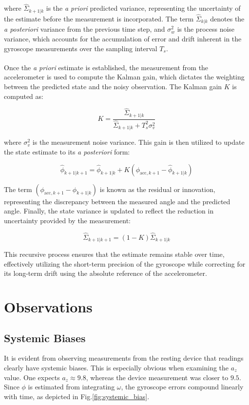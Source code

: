 \documentclass{article}
\begin{document}
where $\hat{\Sigma}_{k+1|k}$ is the \textit{a priori} predicted variance, representing the uncertainty of the estimate before the measurement is incorporated. The term $\hat{\Sigma}_{k|k}$ denotes the \textit{a posteriori} variance from the previous time step, and $\sigma_{w}^{2}$ is the process noise variance, which accounts for the accumulation of error and drift inherent in the gyroscope measurements over the sampling interval $T_s$.\\
\\

Once the \textit{a priori} estimate is established, the measurement from the accelerometer is used to compute the Kalman gain, which dictates the weighting between the predicted state and the noisy observation. The Kalman gain $K$ is computed as:

\begin{equation}
K = \frac{\hat{\Sigma}_{k+1|k}}{\hat{\Sigma}_{k+1|k} + T_{s}^{2}\sigma_{v}^{2}}
\end{equation}

where $\sigma_{v}^{2}$ is the measurement noise variance. This gain is then utilized to update the state estimate to its \textit{a posteriori} form:

\begin{equation}
\hat{\phi}_{k+1|k+1} = \hat{\phi}_{k+1|k} + K (\phi_{\text{acc},k+1} - \hat{\phi}_{k+1|k})
\end{equation}

The term $(\phi_{\text{acc},k+1} - \hat{\phi}_{k+1|k})$ is known as the residual or innovation, representing the discrepancy between the measured angle and the predicted angle. Finally, the state variance is updated to reflect the reduction in uncertainty provided by the measurement:

\begin{equation}
\hat{\Sigma}_{k+1|k+1} = (1 - K) \hat{\Sigma}_{k+1|k}
\end{equation}

This recursive process ensures that the estimate remains stable over time, effectively utilizing the short-term precision of the gyroscope while correcting for its long-term drift using the absolute reference of the accelerometer.

\section{Observations}

\subsection{Systemic Biases}
It is evident from observing measurements from the resting device that readings clearly have systemic biases. This is especially obvious when examining the $a_z$ value. One expects $a_z \approx 9.8$, whereas the device measurement was closer to $9.5$. Since $\phi$ is estimated from integrating $\omega$, the gyroscope errors compound linearly with time, as depicted in Fig.\ref{fig:systemic_bias}.
\end{document}
